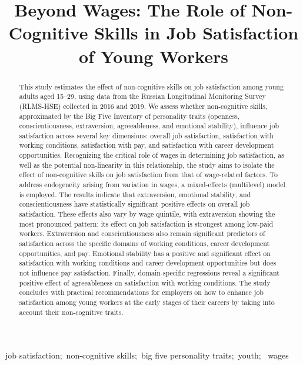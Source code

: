 \documentclass[
]{interact}
\title{Beyond Wages: The Role of Non-Cognitive Skills in Job
Satisfaction of Young Workers}
\author{}
\begin{document}
\captionsetup{labelsep=space}
\maketitle

\begin{abstract}
This study estimates the effect of non-cognitive skills on job
satisfaction among young adults aged 15--29, using data from the Russian
Longitudinal Monitoring Survey (RLMS-HSE) collected in 2016 and 2019. We
assess whether non-cognitive skills, approximated by the Big Five
Inventory of personality traits (openness, conscientiousness,
extraversion, agreeableness, and emotional stability), influence job
satisfaction across several key dimensions: overall job satisfaction,
satisfaction with working conditions, satisfaction with pay, and
satisfaction with career development opportunities. Recognizing the
critical role of wages in determining job satisfaction, as well as the
potential non-linearity in this relationship, the study aims to isolate
the effect of non-cognitive skills on job satisfaction from that of
wage-related factors. To address endogeneity arising from variation in
wages, a mixed-effects (multilevel) model is employed. The results
indicate that extraversion, emotional stability, and conscientiousness
have statistically significant positive effects on overall job
satisfaction. These effects also vary by wage quintile, with
extraversion showing the most pronounced pattern: its effect on job
satisfaction is strongest among low-paid workers. Extraversion and
conscientiousness also remain significant predictors of satisfaction
across the specific domains of working conditions, career development
opportunities, and pay. Emotional stability has a positive and
significant effect on satisfaction with working conditions and career
development opportunities but does not influence pay satisfaction.
Finally, domain-specific regressions reveal a significant positive
effect of agreeableness on satisfaction with working conditions. The
study concludes with practical recommendations for employers on how to
enhance job satisfaction among young workers at the early stages of
their careers by taking into account their non-cognitive traits.
\end{abstract}
\begin{keywords}
\def\sep{;\ }
job satisfaction\sep non-cognitive skills\sep big five personality
traits\sep youth\sep 
wages
\end{keywords}


\newpage
\end{document}

